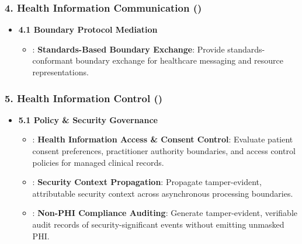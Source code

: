 \subsubsection*{4. Health Information Communication (\texttt{})}
\label{rad:enabling:627}

\begin{itemize}

\item
\textbf{4.1 Boundary Protocol Mediation}


\begin{itemize}

\item
\texttt{}: \textbf{Standards-Based Boundary Exchange}: Provide standards-conformant boundary exchange for healthcare messaging and resource representations.



\end{itemize}


\end{itemize}
\label{rad:enabling:630}
\subsubsection*{5. Health Information Control (\texttt{})}
\label{rad:enabling:631}

\begin{itemize}

\item
\textbf{5.1 Policy \& Security Governance}


\begin{itemize}

\item
\texttt{}: \textbf{Health Information Access \& Consent Control}: Evaluate patient consent preferences, practitioner authority boundaries, and access control policies for managed clinical records.



\item
\texttt{}: \textbf{Security Context Propagation}: Propagate tamper-evident, attributable security context across asynchronous processing boundaries.



\item
\texttt{}: \textbf{Non-PHI Compliance Auditing}: Generate tamper-evident, verifiable audit records of security-significant events without emitting unmasked PHI.



\end{itemize}


\end{itemize}
\label{rad:enabling:636}
